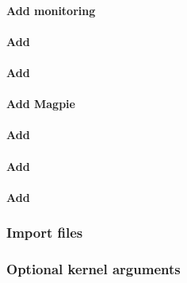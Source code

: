 \documentclass[letterpaper]{article}
\begin{document}
\clearpage
\paragraph{Add \Nagios{} monitoring} \label{sec:add_nagios}


\clearpage
\paragraph{Add \clustershell{}}


\paragraph{Add \genders{}}


\paragraph{Add Magpie}


\paragraph{Add \conman{}} \label{sec:add_conman}


\paragraph{Add \nhc{}} \label{sec:add_nhc}



\paragraph{Add \GEOPM{}} \label{sec:add_geopm}


\subsubsection{Import files} \label{sec:file_import}



\vspace*{-.1cm}





\vspace*{-0.2cm}
\subsubsection{Optional kernel arguments} \label{sec:optional_kargs}


\end{document}
